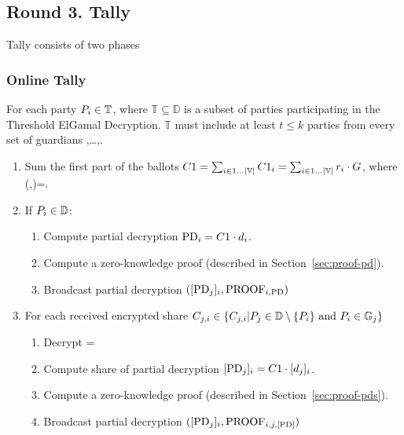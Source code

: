 \documentclass{article}
\begin{document}
\subsection{Round 3. Tally}

Tally consists of two phases
\subsubsection{Online Tally}

For each party $P_{i} \in \mathbb{T}$, where $\mathbb{T} \subseteq  \mathbb{D}$ is a subset of parties participating in the Threshold ElGamal Decryption. $\mathbb{T}$ must include at least $t \leq k$ parties from every set of guardians ,\dots,.
\begin{enumerate}
    \item Sum the first part of the ballots $C1 = \sum_{i \in 1 \dots |\mathbb{V}|} C1_{i} = \sum_{i \in 1 \dots |\mathbb{V}|} r_{i} \cdot G$, where (,)=.

    \item If $P_{i} \in \mathbb{D}$: \begin{enumerate}
        \item Compute partial decryption  $\mathrm{PD}_{i} = C1 \cdot d_{i}$.
        \item Compute a zero-knowledge proof  (described in Section~\ref{sec:proof-pd}).
        \item Broadcast partial decryption $([\mathrm{PD}_{j}]_{i}, \textrm{PROOF}_{i,\textrm{PD}})$
    \end{enumerate}
    
    \item For each received encrypted share $C_{j,i} \in \{ C_{j,i} | P_{j} \in \mathbb{D} \setminus \{P_{i}\} \text{ and } P_{i} \in \mathbb{G}_{j}\}$ \begin{enumerate}
        \item Decrypt =
        \item Compute share of partial decryption  $[\mathrm{PD}_{j}]_{i} = C1 \cdot [d_{j}]_{i}$. %
        \item Compute a zero-knowledge proof  (described in Section~\ref{sec:proof-pds}).
        \item Broadcast partial decryption $([\mathrm{PD}_{j}]_{i}, \textrm{PROOF}_{i,j,\textrm{[PD]}})$
    \end{enumerate}
    
\end{enumerate}
\end{document}
